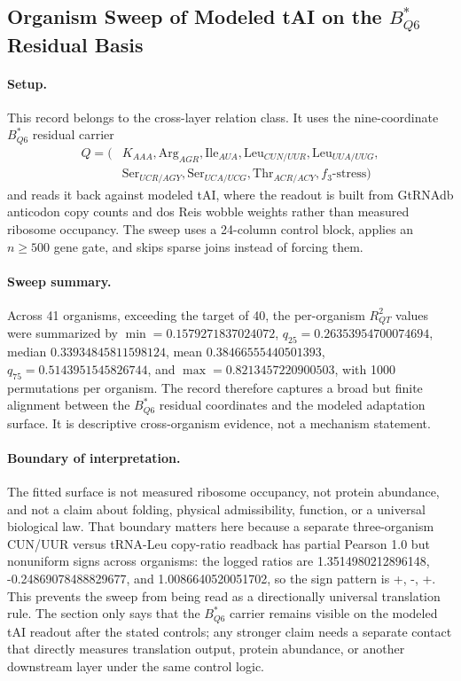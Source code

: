 \subsection{Organism Sweep of Modeled tAI on the $B^*_{Q6}$ Residual Basis}
\label{subsec:bio-reality-sqt-organism-sweep-b-star-q6-modeled-tai}

\paragraph{Setup.} This record belongs to the cross-layer relation class. It uses the nine-coordinate $B^*_{Q6}$ residual carrier
$$\begin{aligned}
Q = (&K_{AAA}, \mathrm{Arg}_{AGR}, \mathrm{Ile}_{AUA}, \mathrm{Leu}_{CUN/UUR}, \mathrm{Leu}_{UUA/UUG},\\
&\mathrm{Ser}_{UCR/AGY}, \mathrm{Ser}_{UCA/UCG}, \mathrm{Thr}_{ACR/ACY}, f_3\text{-stress})
\end{aligned}$$
and reads it back against modeled tAI, where the readout is built from GtRNAdb anticodon copy counts and dos Reis wobble weights rather than measured ribosome occupancy. The sweep uses a 24-column control block, applies an $n \ge 500$ gene gate, and skips sparse joins instead of forcing them.

\paragraph{Sweep summary.} Across 41 organisms, exceeding the target of 40, the per-organism $R^2_{QT}$ values were summarized by $\min = 0.1579271837024072$, $q_{25} = 0.26353954700074694$, median $0.33934845811598124$, mean $0.38466555440501393$, $q_{75} = 0.5143951545826744$, and $\max = 0.8213457220900503$, with 1000 permutations per organism. The record therefore captures a broad but finite alignment between the $B^*_{Q6}$ residual coordinates and the modeled adaptation surface. It is descriptive cross-organism evidence, not a mechanism statement.

\paragraph{Boundary of interpretation.} The fitted surface is not measured ribosome occupancy, not protein abundance, and not a claim about folding, physical admissibility, function, or a universal biological law. That boundary matters here because a separate three-organism CUN/UUR versus tRNA-Leu copy-ratio readback has partial Pearson 1.0 but nonuniform signs across organisms: the logged ratios are 1.3514980212896148, -0.24869078488829677, and 1.0086640520051702, so the sign pattern is +, -, +. This prevents the sweep from being read as a directionally universal translation rule. The section only says that the $B^*_{Q6}$ carrier remains visible on the modeled tAI readout after the stated controls; any stronger claim needs a separate contact that directly measures translation output, protein abundance, or another downstream layer under the same control logic.